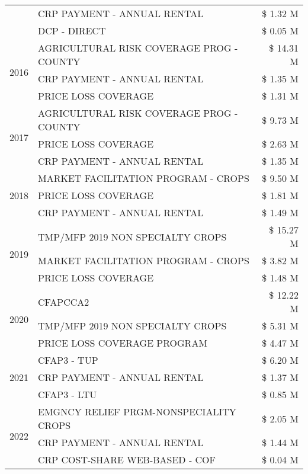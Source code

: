 \begin{tabular}{llr}
 & CRP PAYMENT - ANNUAL RENTAL & \$ 1.32 M \\
 & DCP - DIRECT & \$ 0.05 M \\
\cline{1-3}
\multirow[t]{3}{*}{2016} & AGRICULTURAL RISK COVERAGE PROG - COUNTY & \$ 14.31 M \\
 & CRP PAYMENT - ANNUAL RENTAL & \$ 1.35 M \\
 & PRICE LOSS COVERAGE & \$ 1.31 M \\
\cline{1-3}
\multirow[t]{3}{*}{2017} & AGRICULTURAL RISK COVERAGE PROG - COUNTY & \$ 9.73 M \\
 & PRICE LOSS COVERAGE & \$ 2.63 M \\
 & CRP PAYMENT - ANNUAL RENTAL & \$ 1.35 M \\
\cline{1-3}
\multirow[t]{3}{*}{2018} & MARKET FACILITATION PROGRAM - CROPS & \$ 9.50 M \\
 & PRICE LOSS COVERAGE & \$ 1.81 M \\
 & CRP PAYMENT - ANNUAL RENTAL & \$ 1.49 M \\
\cline{1-3}
\multirow[t]{3}{*}{2019} & TMP/MFP 2019 NON SPECIALTY CROPS & \$ 15.27 M \\
 & MARKET FACILITATION PROGRAM - CROPS & \$ 3.82 M \\
 & PRICE LOSS COVERAGE & \$ 1.48 M \\
\cline{1-3}
\multirow[t]{3}{*}{2020} & CFAPCCA2 & \$ 12.22 M \\
 & TMP/MFP 2019 NON SPECIALTY CROPS & \$ 5.31 M \\
 & PRICE LOSS COVERAGE PROGRAM & \$ 4.47 M \\
\cline{1-3}
\multirow[t]{3}{*}{2021} & CFAP3 - TUP & \$ 6.20 M \\
 & CRP PAYMENT - ANNUAL RENTAL & \$ 1.37 M \\
 & CFAP3 - LTU & \$ 0.85 M \\
\cline{1-3}
\multirow[t]{3}{*}{2022} & EMGNCY RELIEF PRGM-NONSPECIALITY CROPS & \$ 2.05 M \\
 & CRP PAYMENT - ANNUAL RENTAL & \$ 1.44 M \\
 & CRP COST-SHARE WEB-BASED - COF & \$ 0.04 M \\
\cline{1-3}
\bottomrule
\end{tabular}
